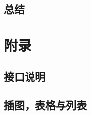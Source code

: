 \documentclass[UTF8]{ctexrep} %
\begin{document}
\chapter{总结}

\newpage
\part{附录}


\begin{appendices}
\chapter{接口说明}

\chapter{插图，表格与列表}
\listoffigures
\listoftables
\listoflistings
\end{appendices}
\end{document}

